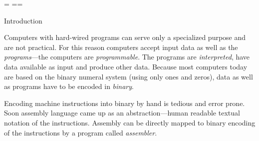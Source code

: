 {\nopagenumbers
  {\pgbackground={
    \picwidth=\pagewidth \picheight=\pageheight
    }
    \null\vfil\break}
  \null\vfil\break}
\makefront

\chap Introduction

%
%
%
%
%
%
%
%
%
%
%
%
%
%
%
%
%
%
%
%
%
%
%
%
%
%


Computers with hard-wired programs can serve only a specialized purpose and are
not practical. For this reason computers accept input data as well as the {\em
programs}---the computers are {\em programmable}. The programs are {\em
interpreted}, have data available as input and produce other data. Because most
computers today are based on the binary numeral system (using only ones and
zeros), data as well as programs have to be encoded in {\em binary}.

Encoding machine instructions into binary by hand is tedious and error prone.
Soon assembly language came up as an abstraction---human readable textual
notation of the instructions. Assembly can be directly mapped to binary encoding
of the instructions by a program called {\em assembler}.

